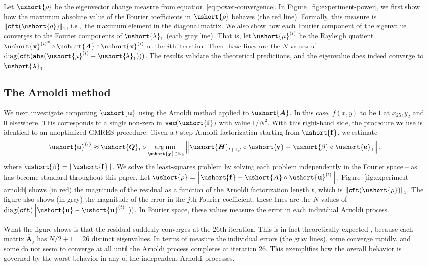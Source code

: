 \documentclass[1p,authoryear,letterpaper]{elsarticle}
\renewcommand{\cite}{\citep}
\DeclareMathOperator{\tabs}{\texttt{abs}}
\DeclareMathOperator{\tvec}{\texttt{vec}}
\providecommand{\KK}{\mathbb{K}}
\providecommand{\normof}[2][]{\left\| #2 \right\|_{#1}}\providecommand{\nnormof}[2][]{\| #2 \|_{#1}}\providecommand{\itr}[2]{#1^{(#2)}}
\providecommand{\itn}[1]{^{(#1)}}\providecommand{\cardof}[1]{\left| #1 \right|}
\providecommand{\mat}{\boldsymbol}
\renewcommand{\vec}{\mathbf}
\providecommand{\mhat}[1]{\ensuremath{\mat{\hat{#1}}}}
\providecommand{\mAhat}{\mhat{A}}
\DeclareMathOperator{\cft}{\texttt{cft}}
\newcommand{\cel}[1]{\ushort{#1}}
\newcommand{\celm}[1]{\cel{\mat{#1}}}
\newcommand{\celv}[1]{\cel{\vec{#1}}}
\newcommand{\cbeta}{\ensuremath{\cel{\beta}}}
\newcommand{\clambda}{\ensuremath{\cel{\lambda}}}
\newcommand{\cve}{\ensuremath{\celv{e}}}
\newcommand{\cvf}{\ensuremath{\celv{f}}}
\newcommand{\cvu}{\ensuremath{\celv{u}}}
\newcommand{\cvx}{\ensuremath{\celv{x}}}
\newcommand{\cvy}{\ensuremath{\celv{y}}}
\providecommand{\cmA}{\ensuremath{\celm{A}}}
\providecommand{\cmH}{\ensuremath{\celm{H}}}
\providecommand{\cmQ}{\ensuremath{\celm{Q}}}
\begin{document}
Let $\cel{\rho}$ be the eigenvector
change measure from equation~\eqref{eq:power-convergence}.
In Figure~\ref{fig:experiment-power}, we first show how
the maximum absolute value of the Fourier coefficients
in $\cel{\rho}$ behaves (the red line).
Formally, this measure is $\normof[1]{\cft(\cel{\rho})}$, i.e.,\ the
maximum element in the diagonal matrix.  We also show 
how each Fourier component of the eigenvalue
converges to the Fourier components of $\clambda_1$ (each gray line).
That is, let $\cel{\mu}\itn{i}$
be the Rayleigh quotient ${\cvx\itn{i}}^* \circ \cmA \circ \cvx\itn{i}$
at the $i$th iteration.  Then these lines are the $N$ values of
$\diag(\cft(\tabs(\cel{\mu}\itn{i} - \clambda_1)))$.
The results validate the
theoretical predictions, and the eigenvalue does
indeed converge to $\clambda_1$.  




\subsection{The Arnoldi method}

We next investigate computing $\cvu$ using the Arnoldi
method applied to $\cmA$.  In this case, $f(x,y)$ to
be $1$ at $x_{25},y_2$ and $0$ elsewhere.  This corresponds
to a single non-zero in $\tvec(\cvf)$ with value $1/N^2$.
With this right-hand side,
the procedure we use is identical
to an unoptimized GMRES procedure.  Given a $t$-step Arnoldi
factorization starting from $\cvf$, we estimate
\[ \cvu\itn{t} \approx
 \cmQ_t \circ \mathop{\mathrm{arg\,min}}_{\cvy \in\KK_k} \normof{\cmH_{t+1,t} \circ \cvy - \cbeta \circ \cve_1},
\]
where $\cbeta=\normof{\cvf}$.
We solve the least-squares problem by solving each problem
independently in the Fourier space -- as has become standard throughout
this paper.  Let $\cel{\rho} = \normof{\cvf - \cmA \circ \cvu\itn{t}}$.
Figure~\ref{fig:experiment-arnoldi} shows (in red) the
magnitude of the residual as a function of the Arnoldi factorization
length $t$, which is $\normof[1]{\cft(\cel{\rho})}$.  
The figure also shows (in gray) the magnitude of the error in the
$j$th Fourier coefficient; these lines are the $N$ values of
$\diag(\cft(\normof{\cvu - \cvu\itn{t}}))$.
In Fourier space,
these values measure the error in  each individual Arnoldi
process.

What the figure shows is that the residual suddenly converges
at the $26$th iteration.  This is in fact theoretically expected \cite{saad2003-book}, because
each matrix $\mAhat_j$ has $N/2+1=26$ distinct eigenvalues.
In terms of measure the individual errors (the gray lines), 
some converge
rapidly, and some do not seem to converge at all until the
Arnoldi process completes at iteration 26.  This exemplifies
how the overall behavior is governed by the worst behavior
in any of the independent Arnoldi processes.
\end{document}
